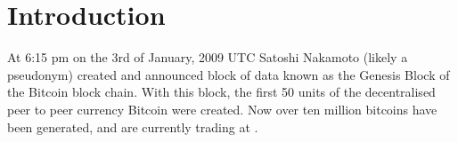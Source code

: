 \section{Introduction}
%
%



% 
% 
% 
% 

At 6:15 pm on the 3rd of January, 2009 UTC Satoshi Nakamoto (likely a pseudonym)
created and announced block of data known as the Genesis Block of the Bitcoin
block chain\cite{satoshi}. With this block, the first 50 units of the
decentralised peer to peer currency Bitcoin were created.  Now over ten million
bitcoins have been generated, and are currently trading at .


